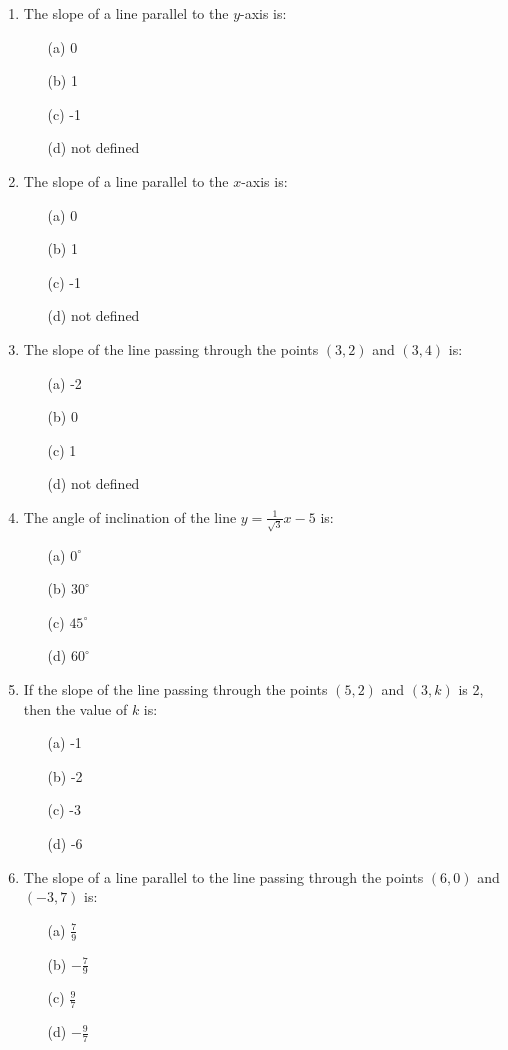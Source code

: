 \documentclass[12pt]{article}
\begin{document}
\begin{multicols}{2}
\begin{enumerate}
	\item The slope of a line parallel to the \( y \)-axis is:
	\begin{itemize}
		\item[(a)] 0
		\item[(b)] 1
		\item[(c)] -1
		\item[(d)] not defined
	\end{itemize}
	
	\item The slope of a line parallel to the \( x \)-axis is:
	\begin{itemize}
		\item[(a)] 0
		\item[(b)] 1
		\item[(c)] -1
		\item[(d)] not defined
	\end{itemize}
	
	\item The slope of the line passing through the points \( (3, 2) \) and \( (3, 4) \) is:
	\begin{itemize}
		\item[(a)] -2
		\item[(b)] 0
		\item[(c)] 1
		\item[(d)] not defined
	\end{itemize}
	
	\item The angle of inclination of the line \( y = \frac{1}{\sqrt{3}}x - 5 \) is:
	\begin{itemize}
		\item[(a)] \( 0^\circ \)
		\item[(b)] \( 30^\circ \)
		\item[(c)] \( 45^\circ \)
		\item[(d)] \( 60^\circ \)
	\end{itemize}
	
	\item If the slope of the line passing through the points \( (5, 2) \) and \( (3, k) \) is 2, then the value of \( k \) is:
	\begin{itemize}
		\item[(a)] -1
		\item[(b)] -2
		\item[(c)] -3
		\item[(d)] -6
	\end{itemize}
	
	\item The slope of a line parallel to the line passing through the points \( (6, 0) \) and \( (-3, 7) \) is:
	\begin{itemize}
		\item[(a)] \( \frac{7}{9} \)
		\item[(b)] \( -\frac{7}{9} \)
		\item[(c)] \( \frac{9}{7} \)
		\item[(d)] \( -\frac{9}{7} \)
	\end{itemize}
	

\end{enumerate}
\end{multicols}
\end{document}
